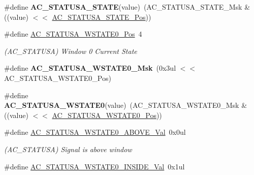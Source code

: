 \begin{DoxyCompactItemize}
\item 
\hypertarget{group___s_a_m_l21___a_c_ga5891edfb38f48e5188febf60797d3485}{}\#define {\bfseries A\+C\+\_\+\+S\+T\+A\+T\+U\+S\+A\+\_\+\+S\+T\+A\+T\+E}(value)~(A\+C\+\_\+\+S\+T\+A\+T\+U\+S\+A\+\_\+\+S\+T\+A\+T\+E\+\_\+\+Msk \& ((value) $<$$<$ \hyperlink{group___s_a_m_l21___a_c_gac205365550f29571c942656a16ca58f6}{A\+C\+\_\+\+S\+T\+A\+T\+U\+S\+A\+\_\+\+S\+T\+A\+T\+E\+\_\+\+Pos}))\label{group___s_a_m_l21___a_c_ga5891edfb38f48e5188febf60797d3485}

\item 
\hypertarget{group___s_a_m_l21___a_c_ga1339364deea09e22e0aa9d6cc65e9548}{}\#define \hyperlink{group___s_a_m_l21___a_c_ga1339364deea09e22e0aa9d6cc65e9548}{A\+C\+\_\+\+S\+T\+A\+T\+U\+S\+A\+\_\+\+W\+S\+T\+A\+T\+E0\+\_\+\+Pos}~4\label{group___s_a_m_l21___a_c_ga1339364deea09e22e0aa9d6cc65e9548}

\begin{DoxyCompactList}\small\item\em (A\+C\+\_\+\+S\+T\+A\+T\+U\+S\+A) Window 0 Current State \end{DoxyCompactList}\item 
\hypertarget{group___s_a_m_l21___a_c_ga286dc35efc7ab8258fb3a00eaeff1854}{}\#define {\bfseries A\+C\+\_\+\+S\+T\+A\+T\+U\+S\+A\+\_\+\+W\+S\+T\+A\+T\+E0\+\_\+\+Msk}~(0x3ul $<$$<$ A\+C\+\_\+\+S\+T\+A\+T\+U\+S\+A\+\_\+\+W\+S\+T\+A\+T\+E0\+\_\+\+Pos)\label{group___s_a_m_l21___a_c_ga286dc35efc7ab8258fb3a00eaeff1854}

\item 
\hypertarget{group___s_a_m_l21___a_c_ga072eca391c409ede84148d74d04938b3}{}\#define {\bfseries A\+C\+\_\+\+S\+T\+A\+T\+U\+S\+A\+\_\+\+W\+S\+T\+A\+T\+E0}(value)~(A\+C\+\_\+\+S\+T\+A\+T\+U\+S\+A\+\_\+\+W\+S\+T\+A\+T\+E0\+\_\+\+Msk \& ((value) $<$$<$ \hyperlink{group___s_a_m_l21___a_c_ga1339364deea09e22e0aa9d6cc65e9548}{A\+C\+\_\+\+S\+T\+A\+T\+U\+S\+A\+\_\+\+W\+S\+T\+A\+T\+E0\+\_\+\+Pos}))\label{group___s_a_m_l21___a_c_ga072eca391c409ede84148d74d04938b3}

\item 
\hypertarget{group___s_a_m_l21___a_c_ga5d68a94c071ee73a4849497dfc57f3a0}{}\#define \hyperlink{group___s_a_m_l21___a_c_ga5d68a94c071ee73a4849497dfc57f3a0}{A\+C\+\_\+\+S\+T\+A\+T\+U\+S\+A\+\_\+\+W\+S\+T\+A\+T\+E0\+\_\+\+A\+B\+O\+V\+E\+\_\+\+Val}~0x0ul\label{group___s_a_m_l21___a_c_ga5d68a94c071ee73a4849497dfc57f3a0}

\begin{DoxyCompactList}\small\item\em (A\+C\+\_\+\+S\+T\+A\+T\+U\+S\+A) Signal is above window \end{DoxyCompactList}\item 
\hypertarget{group___s_a_m_l21___a_c_ga98fe4b3c6fd307062f3a7e2c5709bc78}{}\#define \hyperlink{group___s_a_m_l21___a_c_ga98fe4b3c6fd307062f3a7e2c5709bc78}{A\+C\+\_\+\+S\+T\+A\+T\+U\+S\+A\+\_\+\+W\+S\+T\+A\+T\+E0\+\_\+\+I\+N\+S\+I\+D\+E\+\_\+\+Val}~0x1ul\label{group___s_a_m_l21___a_c_ga98fe4b3c6fd307062f3a7e2c5709bc78}


\end{DoxyCompactItemize}
